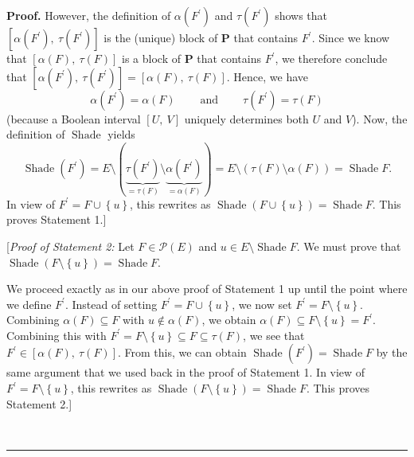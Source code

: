 \documentclass[numbers=enddot,12pt,final,onecolumn]{scrartcl}%
\theoremstyle{definition}
\newenvironment{proof}[1][Proof]{\noindent\textbf{#1.} }{\ \rule{0.5em}{0.5em}}
\newenvironment{vershort}{}{}
\begin{document}
\begin{proof}
However, the definition of $\alpha\left(  F^{\prime}\right)  $ and
$\tau\left(  F^{\prime}\right)  $ shows that $\left[  \alpha\left(  F^{\prime
}\right)  ,\ \tau\left(  F^{\prime}\right)  \right]  $ is the (unique) block
of $\mathbf{P}$ that contains $F^{\prime}$. Since we know that $\left[
\alpha\left(  F\right)  ,\ \tau\left(  F\right)  \right]  $ is a block of
$\mathbf{P}$ that contains $F^{\prime}$, we therefore conclude that $\left[
\alpha\left(  F^{\prime}\right)  ,\ \tau\left(  F^{\prime}\right)  \right]
=\left[  \alpha\left(  F\right)  ,\ \tau\left(  F\right)  \right]  $. Hence,
we have%
\[
\alpha\left(  F^{\prime}\right)  =\alpha\left(  F\right)
\ \ \ \ \ \ \ \ \ \ \text{and}\ \ \ \ \ \ \ \ \ \ \tau\left(  F^{\prime
}\right)  =\tau\left(  F\right)
\]
(because a Boolean interval $\left[  U,\ V\right]  $ uniquely determines both
$U$ and $V$). Now, the definition of $\operatorname*{Shade}$ yields%
\[
\operatorname*{Shade}\left(  F^{\prime}\right)  =E\setminus\left(
\underbrace{\tau\left(  F^{\prime}\right)  }_{=\tau\left(  F\right)
}\setminus\underbrace{\alpha\left(  F^{\prime}\right)  }_{=\alpha\left(
F\right)  }\right)  =E\setminus\left(  \tau\left(  F\right)  \setminus
\alpha\left(  F\right)  \right)  =\operatorname*{Shade}F.
\]
In view of $F^{\prime}=F\cup\left\{  u\right\}  $, this rewrites as
$\operatorname*{Shade}\left(  F\cup\left\{  u\right\}  \right)
=\operatorname*{Shade}F$. This proves Statement 1.]

[\textit{Proof of Statement 2:} Let $F\in\mathcal{P}\left(  E\right)  $ and
$u\in E\setminus\operatorname*{Shade}F$. We must prove that
$\operatorname*{Shade}\left(  F\setminus\left\{  u\right\}  \right)
=\operatorname*{Shade}F$.

\begin{vershort}
We proceed exactly as in our above proof of Statement 1 up until the point
where we define $F^{\prime}$. Instead of setting $F^{\prime}=F\cup\left\{
u\right\}  $, we now set $F^{\prime}=F\setminus\left\{  u\right\}  $.
Combining $\alpha\left(  F\right)  \subseteq F$ with $u\notin\alpha\left(
F\right)  $, we obtain $\alpha\left(  F\right)  \subseteq F\setminus\left\{
u\right\}  =F^{\prime}$. Combining this with $F^{\prime}=F\setminus\left\{
u\right\}  \subseteq F\subseteq\tau\left(  F\right)  $, we see that
$F^{\prime}\in\left[  \alpha\left(  F\right)  ,\ \tau\left(  F\right)
\right]  $. From this, we can obtain $\operatorname*{Shade}\left(  F^{\prime
}\right)  =\operatorname*{Shade}F$ by the same argument that we used back in
the proof of Statement 1. In view of $F^{\prime}=F\setminus\left\{  u\right\}
$, this rewrites as $\operatorname*{Shade}\left(  F\setminus\left\{
u\right\}  \right)  =\operatorname*{Shade}F$. This proves Statement 2.]
\end{vershort}


\end{proof}
\end{document}
